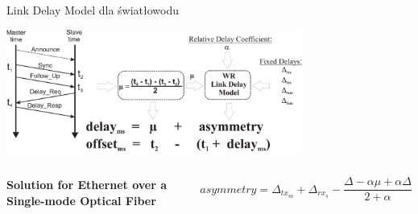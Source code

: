 \documentclass[compress,red]{beamer}
\begin{document}
\begin{frame}{Link Delay Model dla światłowodu}

  \begin{center}
  \includegraphics[height=4cm]{protocol/wrLinkModel.pdf}
  \end{center}

  \begin{columns}[c]
  \column{1.5in}

    \begin{center}
      \textbf{Solution for Ethernet over a Single-mode Optical Fiber}
    \end{center}    

  \column{2.7in}

    \begin{equation}
      \nonumber asymmetry = \Delta_{tx_m} + \Delta_{rx_s} - \frac{\Delta - \alpha \mu + \alpha \Delta}{2 + \alpha}
    \end{equation}

  \end{columns}

\end{frame}
\end{document}
